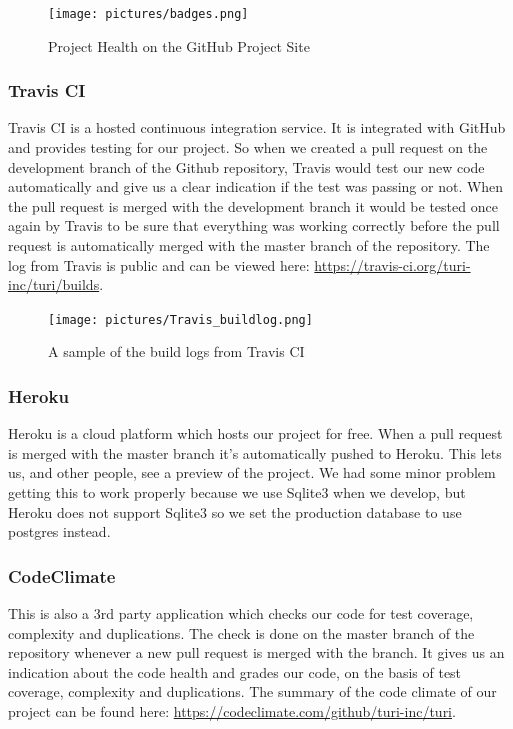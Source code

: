 \documentclass[a4paper]{article}
\begin{document}
\begin{figure}[!h]
  \begin{center}
    \texttt{[image: pictures/badges.png]}
    \caption{Project Health on the GitHub Project Site}
    \label{fig:badges}
  \end{center}
\end{figure}


\subsubsection{Travis CI}
Travis CI is a hosted continuous integration service. It is integrated with GitHub and provides testing for our project. So when we created a pull request on the development branch of the Github repository, Travis would test our new code automatically and give us a clear indication if the test was passing or not. When the pull request is merged with the development branch it would be tested once again by Travis to be sure that everything was working correctly before the pull request is automatically merged with the master branch of the repository. The log from Travis is public and can be viewed here: \url{https://travis-ci.org/turi-inc/turi/builds}.

\begin{figure}[!h]
  \begin{center}
    \texttt{[image: pictures/Travis\_buildlog.png]}
    \caption{A sample of the build logs from Travis CI}
    \label{fig:travis_log}
  \end{center}
\end{figure}


\subsubsection{Heroku}
Heroku is a cloud platform which hosts our project for free. When a pull request is merged with the master branch it's automatically pushed to Heroku. This lets us, and other people, see a preview of the project. We had some minor problem getting this to work properly because we use Sqlite3 when we develop, but Heroku does not support Sqlite3 so we set the production database to use postgres instead.

\subsubsection{CodeClimate}
This is also a 3rd party application which checks our code for test coverage, complexity and duplications. The check is done on the master branch of the repository whenever a new pull request is merged with the branch. It gives us an indication about the code health and grades our code, on the basis of test coverage, complexity and duplications. The summary of the code climate of our project can be found here: \url{https://codeclimate.com/github/turi-inc/turi}. \\
\end{document}
